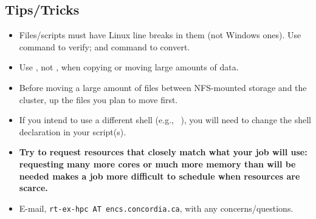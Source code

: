 \subsection{Tips/Tricks}
\label{sect:tips}

\begin{itemize}
\item
Files/scripts must have Linux line breaks in them (not Windows ones).
Use  command to verify; and  command
to convert.

\item
Use , not , when copying or moving large amounts of data.

\item
Before moving a large amount of files between NFS-mounted storage and the 
cluster,  up the files you plan to move first. 

\item
If you intend to use a different shell (e.g., ~\cite{aosa-book-vol1-bash}),
you will need to change the shell declaration in your script(s).


\item
\textbf{Try to request resources that closely match what your job will use: 
requesting many more cores or much more memory than will be needed makes a 
job more difficult to schedule when resources are scarce.}

\item
E-mail, \texttt{rt-ex-hpc AT encs.concordia.ca}, with any concerns/questions.
\end{itemize}